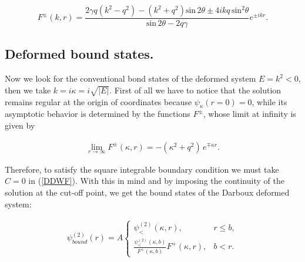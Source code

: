 \documentclass[a4paper]{jpconf}
\begin{document}
\begin{equation}
F^{\pm}(k,r)=\frac{2\gamma q(k^{2}-q^{2})-(k^{2}+q^{2})\mathrm{sin}\,2\theta\pm4ikq\,\mathrm{sin^{2}}\theta}{\mathrm{sin}\,2\theta-2q\gamma}e^{\pm ikr}.\label{PsiPM}
\end{equation}

\subsection{Deformed bound states.}

Now we look for the conventional bond states of the deformed system $E=k^2<0$, then we take $k=i\kappa=i\sqrt{|E|}$. First of all we have to notice that the solution remains regular at the origin of coordinates because $\psi_\kappa(r=0)=0$, while its asymptotic behavior is determined by the functions $F^{\pm}$, whose limit at infinity is given by 

\begin{eqnarray*}
\lim_{r\rightarrow\infty}F^{\pm}(\kappa,r)=-(\kappa^2+q^2)\, e^{\mp \kappa r}.
\end{eqnarray*}

Therefore, to satisfy the square integrable boundary condition we must take $C = 0$ in (\ref{DDWF}). With this in mind and by imposing the continuity of the solution at the cut-off point, we get the bound states of the Darboux deformed system:

\begin{eqnarray}
\psi_{bound}^{(2)}(r)=A\left\{
\begin{array}{cc}
 \psi_{<}^{(2)}(\kappa,r), & r\leq b,  \\[0.2cm]
\frac{ \psi_{<}^{(2)}(\kappa,b)}{F^{+}(\kappa,b)}F^{+}(\kappa,r),&b<r. \label{DD-BoundStates}
\end{array}
\right.
\end{eqnarray} 
\end{document}
